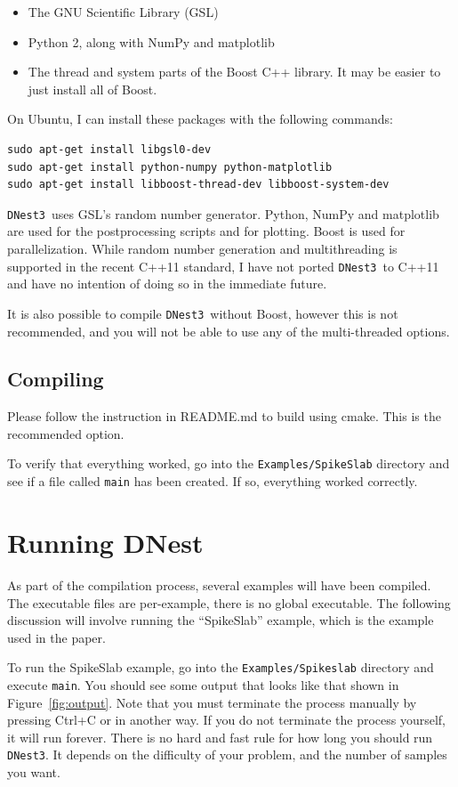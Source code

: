 \documentclass[a4paper, 11pt]{article}
\newcommand{\dnest}{{\tt DNest3}}
\begin{document}
\begin{itemize}
\item The GNU Scientific Library (GSL)
\item Python 2, along with NumPy and matplotlib
\item The thread and system parts of the Boost C++ library.
It may be easier to just install all of Boost.
\end{itemize}

On Ubuntu, I can install these packages with the following commands:
\begin{verbatim}
sudo apt-get install libgsl0-dev
sudo apt-get install python-numpy python-matplotlib
sudo apt-get install libboost-thread-dev libboost-system-dev
\end{verbatim}

\dnest~uses GSL's random number generator. Python, NumPy and
matplotlib are used for the postprocessing scripts and for
plotting. Boost is used for parallelization. While random number generation and
multithreading is supported
in the recent C++11 standard, I have not ported \dnest~to C++11 and have no
intention of doing so in the immediate future.

It is also possible to compile \dnest~without Boost, however this is not
recommended, and you will not be able to use any of the multi-threaded options.

\subsection{Compiling}
Please follow the instruction in README.md to build using cmake. This is the
recommended option.

To
verify that everything worked, go into the {\tt Examples/SpikeSlab} directory
and see if a file called {\tt main} has been created. If so, everything worked
correctly.

\section{Running DNest}
As part of the compilation process, several examples will have been compiled.
The executable files are per-example, there is no global executable. The
following discussion will involve running the ``SpikeSlab'' example, which is
the example used in the paper.

To run the SpikeSlab example, go into the {\tt Examples/Spikeslab}
directory and execute {\tt main}. You should see some output that looks like
that shown in Figure~\ref{fig:output}.
Note that you must terminate the process manually by pressing Ctrl+C
or in another way. If you do not terminate the process yourself, it will run
forever. There is no hard and fast rule for how long you should run \dnest.
It depends on the difficulty of your problem, and the number of samples you
want.
\end{document}
